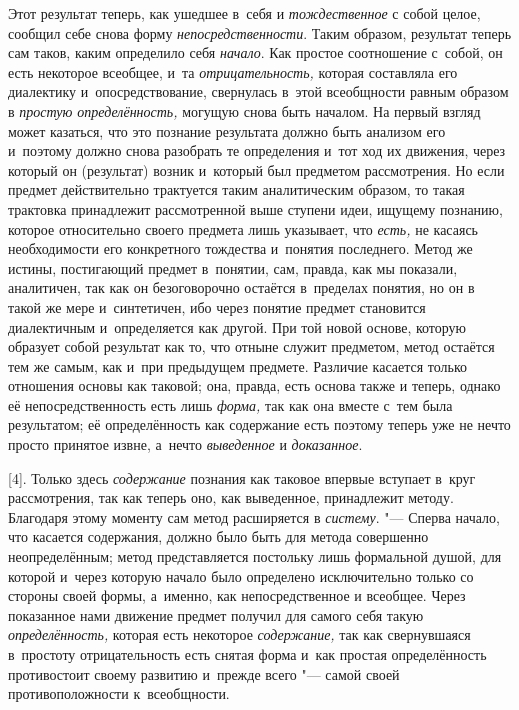 Этот результат теперь, как ушедшее в~себя и {\em тождественное} с
собой целое, сообщил себе снова форму {\em непосредственности}.
Таким образом, результат теперь сам таков, каким определило
себя {\em начало}. Как
простое соотношение с~собой, он есть некоторое всеобщее, и~та
{\em отрицательность,}
которая составляла его диалектику и~опосредствование,
свернулась в~этой всеобщности равным образом в
{\em простую определённость,}
могущую снова быть началом. На первый взгляд может казаться,
что это познание результата должно быть анализом его и~поэтому должно снова
разобрать те определения и~тот ход их движения, через который он
(результат) возник и~который был предметом рассмотрения. Но если предмет
действительно трактуется таким аналитическим образом, то такая трактовка
принадлежит рассмотренной выше ступени идеи, ищущему познанию, которое
относительно своего предмета лишь указывает, что {\em есть,} не касаясь
необходимости его конкретного тождества и~понятия последнего. Метод же
истины, постигающий предмет в~понятии, сам, правда, как мы показали,
аналитичен, так как он безоговорочно остаётся в~пределах понятия, но он в
такой же мере и~синтетичен, ибо через понятие предмет становится
диалектичным и~определяется как другой. При той новой основе, которую
образует собой результат как то, что отныне служит предметом, метод
остаётся тем же самым, как и~при предыдущем предмете. Различие касается
только отношения основы как таковой; она, правда, есть основа также и
теперь, однако её непосредственность есть лишь {\em форма,} так как она
вместе с~тем была результатом; её определённость как содержание есть
поэтому теперь уже не нечто просто принятое извне, а~нечто
{\em выведенное} и {\em доказанное}.

[4]. Только здесь {\em содержание} познания
как таковое впервые вступает в~круг рассмотрения, так как теперь оно, как
выведенное, принадлежит методу. Благодаря этому моменту сам метод
расширяется в {\em систему}. "---
Сперва начало, что касается содержания, должно было быть для
метода совершенно неопределённым; метод представляется постольку лишь
формальной душой, для которой и~через которую начало было определено
исключительно только со стороны своей формы, а~именно, как непосредственное
и всеобщее. Через показанное нами движение предмет получил для самого себя
такую {\em определённость,} которая есть некоторое {\em содержание,} так как
свернувшаяся в~простоту отрицательность есть снятая форма и~как простая
определённость противостоит своему развитию и~прежде всего
"--- самой своей противоположности к~всеобщности.


